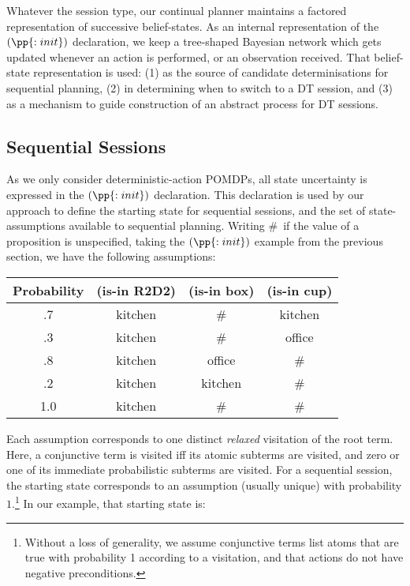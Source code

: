 Whatever the session type, our continual planner maintains a factored
representation of successive belief-states.
As an internal representation of the $(\pp{:init})$
declaration, we keep a tree-shaped Bayesian network which gets updated
whenever an action is performed, or an observation received. That
belief-state representation is used: (1) as the source of candidate
determinisations for sequential planning, (2) in determining when to
switch to a DT session, and (3) as a mechanism to guide construction
of an abstract process for DT sessions.

\subsection{Sequential Sessions}

As we only consider deterministic-action POMDPs, all state
uncertainty is expressed in the $(\pp{:init})$ declaration. This
declaration is used by our approach to define the starting state for
sequential sessions, and the set of state-assumptions available to
sequential planning.  Writing \#\ if the value of a proposition is
unspecified, taking the $(\pp{:init})$ example from the previous
section, we have the following assumptions:

\small
\begin{tabular}{cccc}
\hline
Probability & (is-in R2D2)  & (is-in box)  & (is-in cup) \\
\hline
.7 & kitchen & \# &  kitchen\\
.3 & kitchen & \# & office \\
.8 & kitchen & office & \# \\
.2 & kitchen & kitchen & \# \\
1.0 & kitchen & \# & \# \\
\hline
\end{tabular}
\normalsize

\noindent Each assumption corresponds to one distinct {\em
relaxed} visitation of the root term. Here, a conjunctive term is
visited iff its atomic subterms are visited, and zero or one of its
immediate probabilistic subterms are visited. For a sequential
session, the starting state corresponds to an assumption (usually
unique) with probability $1$.\footnote{Without a loss of generality,
we assume conjunctive terms list atoms that are true with
probability 1 according to a visitation, and that actions do not
have negative preconditions.}  In our example, that starting state is:

